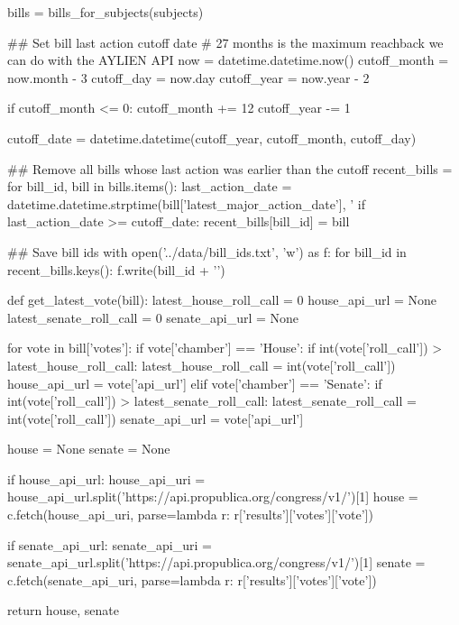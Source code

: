 \begin{pyin}
bills = bills_for_subjects(subjects)
\end{pyin}

\begin{pyin}
\## Set bill last action cutoff date
# 27 months is the maximum reachback we can do with the AYLIEN API
now = datetime.datetime.now()
cutoff_month = now.month - 3
cutoff_day = now.day
cutoff_year = now.year - 2

if cutoff_month <= 0:
    cutoff_month += 12
    cutoff_year -= 1

cutoff_date = datetime.datetime(cutoff_year, cutoff_month, cutoff_day)
\end{pyin}

\begin{pyin}
\## Remove all bills whose last action was earlier than the cutoff
recent_bills = {}
for bill_id, bill in bills.items():
    last_action_date = datetime.datetime.strptime(bill['latest_major_action_date'], '%
    if last_action_date >= cutoff_date:
        recent_bills[bill_id] = bill
\end{pyin}

\begin{pyin}
\## Save bill ids
with open('../data/bill_ids.txt', 'w') as f:
    for bill_id in recent_bills.keys():
        f.write(bill_id + '\n')
\end{pyin}

\begin{pyin}
def get_latest_vote(bill):
    latest_house_roll_call = 0
    house_api_url = None
    latest_senate_roll_call = 0
    senate_api_url = None

    for vote in bill['votes']:
        if vote['chamber'] == 'House':
            if int(vote['roll_call']) > latest_house_roll_call:
                latest_house_roll_call = int(vote['roll_call'])
                house_api_url = vote['api_url']
        elif vote['chamber'] == 'Senate':
            if int(vote['roll_call']) > latest_senate_roll_call:
                latest_senate_roll_call = int(vote['roll_call'])
                senate_api_url = vote['api_url']

    house = None
    senate = None

    if house_api_url:
        house_api_uri = house_api_url.split('https://api.propublica.org/congress/v1/')[1]
        house = c.fetch(house_api_uri, parse=lambda r: r['results']['votes']['vote'])

    if senate_api_url:
        senate_api_uri = senate_api_url.split('https://api.propublica.org/congress/v1/')[1]
        senate = c.fetch(senate_api_uri, parse=lambda r: r['results']['votes']['vote'])

    return house, senate
\end{pyin}

